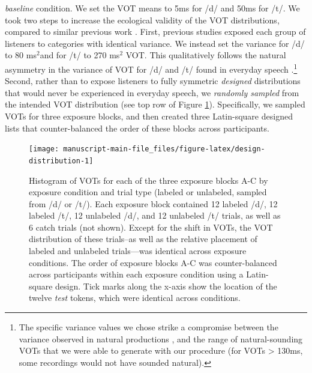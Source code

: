 \documentclass[
  11pt,
  man,mask,floatsintext]{apa6}
\providecommand{\DIFadd}[1]{{\protect\color{blue}\uwave{#1}}} %
\providecommand{\DIFaddbegin}{} %
\providecommand{\DIFaddend}{} %
\newcommand{\DIFaddincludegraphics}[2][]{{\color{blue}\fbox{\DIFOincludegraphics[#1]{#2}}}} %
\DeclareRobustCommand{\DIFaddbegin}{\DIFOaddbegin \let\includegraphics\DIFaddincludegraphics} %
\DeclareRobustCommand{\DIFaddend}{\DIFOaddend \let\includegraphics\DIFOincludegraphics} %
\begin{document}
\DIFadd{We first created the }\DIFaddend \emph{baseline} condition. We set the VOT means to 5ms for /d/ and 50ms for /t/. We took two steps to increase the ecological validity of the VOT distributions, compared to similar previous work \autocite{clayards2008,idemaru-holt2011,idemaru-holt2020,kleinschmidt2015,kleinschmidt2020}. First, previous studies exposed each group of listeners to categories with identical variance. We instead set the variance for /d/ to 80 ms\(^2\)\DIFaddbegin \DIFadd{(SD = 8.9) }\DIFaddend and for /t/ to 270 ms\(^2\) \DIFaddbegin \DIFadd{(SD = 16) }\DIFaddend VOT. This qualitatively follows the natural asymmetry in the variance of VOT for /d/ and /t/ found in everyday speech \autocite{lisker-abramson1964,docherty1992,chodroff-wilson2017}.\footnote{The specific variance values we chose strike a compromise between the variance observed in natural productions \autocite[e.g, mean by-talker variances of 29 ms\(^2\) for /d/ and 275 ms\(^2\) for /t/ in hyper-articulated isolated word productions, and 70 ms\(^2\) for /d/ and 410 ms\(^2\) for /t/ in connected speech,][]{chodroff-wilson2017}, and the range of natural-sounding VOTs that we were able to generate with our procedure (for VOTs \textgreater{} 130ms, some recordings would not have sounded natural).} Second, rather than to expose listeners to fully symmetric \emph{designed} distributions that would never be experienced in everyday speech, we \emph{randomly sampled} from the intended VOT distribution (see top row of Figure \ref{fig:design-distribution}). Specifically, we sampled VOTs for three exposure blocks, and then created three Latin-square designed lists that counter-balanced the order of these blocks across participants.



\begin{figure}

{\centering \texttt{[image: manuscript-main-file\_files/figure-latex/design-distribution-1]} 

}

\caption{Histogram of VOTs for each of the three exposure blocks A-C by exposure condition and trial type (labeled or unlabeled, sampled from /d/ or /t/). Each exposure block contained 12 labeled /d/, 12 labeled /t/, 12 unlabeled /d/, and 12 unlabeled /t/ trials, as well as 6 catch trials (not shown). Except for the shift in VOTs, the VOT distribution of these trials--as well as the relative placement of labeled and unlabeled trials---was identical across exposure conditions. The order of exposure blocks A-C was counter-balanced across participants within each exposure condition using a Latin-square design. Tick marks along the x-axis show the location of the twelve \emph{test} tokens, which were identical across conditions.}\label{fig:design-distribution}
\end{figure}
\end{document}
